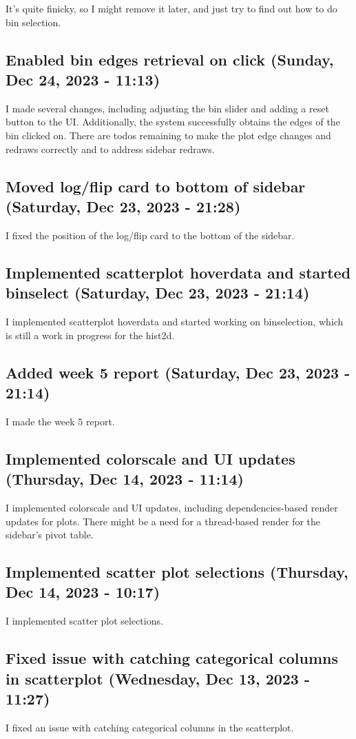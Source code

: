 \documentclass[a4paper]{article}
\begin{document}
It's quite finicky, so I might remove it later, and just try to find out how to do bin selection.

\subsection*{Enabled bin edges retrieval on click (Sunday, Dec 24, 2023 - 11:13)}
I made several changes, including adjusting the bin slider and adding a reset button to the UI. Additionally, the system successfully obtains the edges of the bin clicked on. There are todos remaining to make the plot edge changes and redraws correctly and to address sidebar redraws.

\subsection*{Moved log/flip card to bottom of sidebar (Saturday, Dec 23, 2023 - 21:28)}
I fixed the position of the log/flip card to the bottom of the sidebar.

\subsection*{Implemented scatterplot hoverdata and started binselect (Saturday, Dec 23, 2023 - 21:14)}
I implemented scatterplot hoverdata and started working on binselection, which is still a work in progress for the hist2d.

\subsection*{Added week 5 report (Saturday, Dec 23, 2023 - 21:14)}
I made the week 5 report.

\subsection*{Implemented colorscale and UI updates (Thursday, Dec 14, 2023 - 11:14)}
I implemented colorscale and UI updates, including dependencies-based render updates for plots. There might be a need for a thread-based render for the sidebar's pivot table.

\subsection*{Implemented scatter plot selections (Thursday, Dec 14, 2023 - 10:17)}
I implemented scatter plot selections.

\subsection*{Fixed issue with catching categorical columns in scatterplot (Wednesday, Dec 13, 2023 - 11:27)}
I fixed an issue with catching categorical columns in the scatterplot.
\end{document}
